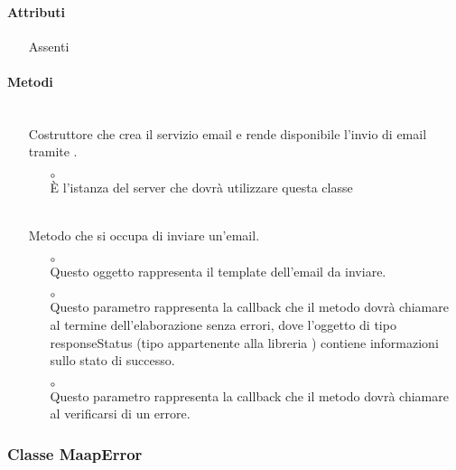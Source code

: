 \paragraph*{Attributi}
\begin{itemize}
\item[] Assenti
\end{itemize}

\paragraph*{Metodi}
\begin{itemize}
\item[]  \\ Costruttore che crea il servizio email e rende disponibile l'invio di email tramite .
\begin{itemize}\addtolength{\itemsep}{-0.5\baselineskip}
\item[$\circ$]  \\ È l'istanza del server che dovrà utilizzare questa classe
\end{itemize}
\item[]  \\ Metodo che si occupa di inviare un'email.
\begin{itemize}\addtolength{\itemsep}{-0.5\baselineskip}
\item[$\circ$]  \\ Questo oggetto rappresenta il template dell'email da inviare.
\item[$\circ$]  \\ Questo parametro rappresenta la callback che il metodo dovrà chiamare al termine dell'elaborazione senza errori, dove l'oggetto di tipo responseStatus (tipo appartenente alla libreria ) contiene informazioni sullo stato di successo.
\item[$\circ$]  \\ Questo parametro rappresenta la callback che il metodo dovrà chiamare al verificarsi di un errore.
\end{itemize}
\end{itemize}

\subsubsection{Classe MaapError}

